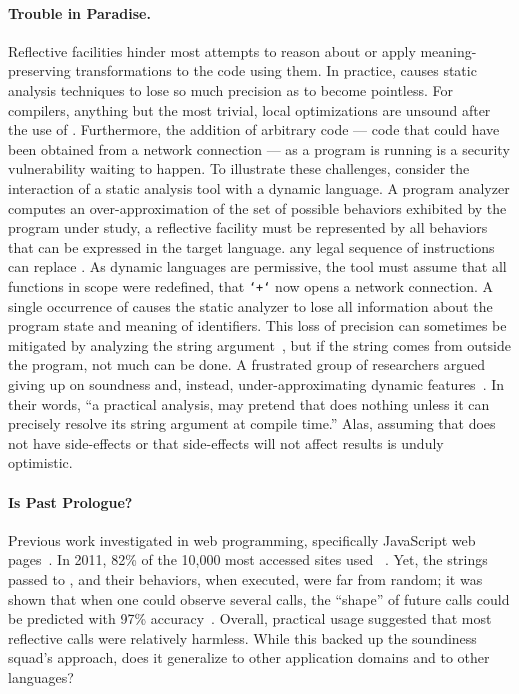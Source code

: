 \documentclass[acmsmall, screen]{acmart}
\begin{document}
\paragraph{Trouble in Paradise.} Reflective facilities hinder
most attempts to reason about or apply meaning-preserving transformations to the
code using them. In practice, \eval causes static analysis techniques to lose so
much precision as to become pointless. For compilers, anything but the most
trivial, local optimizations are unsound after the use of \eval. Furthermore,
the addition of arbitrary code --- code that could have been obtained from a
network connection --- as a program is running is a security vulnerability
waiting to happen. To illustrate these challenges, consider the interaction of a
static analysis tool with a dynamic language. A program analyzer computes an
over-approximation of the set of possible behaviors exhibited by the program
under study, a reflective facility must be represented by all behaviors that can
be expressed in the target language. \ie any legal sequence of instructions can
replace \eval. As dynamic languages are permissive, the tool must assume that
all functions in scope were redefined, \eg that \texttt{`+`} now opens a network
connection. A single occurrence of \eval causes the static analyzer to lose all
information about the program state and meaning of identifiers. This loss of
precision can sometimes be mitigated by analyzing the string
argument~\cite{moller03}, but if the string comes from outside the program, not
much can be done. A frustrated group of researchers argued giving up on
soundness and, instead, under-approximating dynamic features~\cite{soundy}. In
their words, ``a practical analysis, may pretend that \eval does nothing unless
it can precisely resolve its string argument at compile time.'' Alas, assuming
that \eval does not have side-effects or that side-effects will not affect
results is unduly optimistic.

\paragraph{Is Past Prologue?} Previous work investigated
\eval in web programming, specifically JavaScript web pages~\cite{pldi10a}. In
2011, 82\% of the 10,000 most accessed sites used \eval~\cite{ecoop11}. Yet, the
strings passed to \eval, and their behaviors, when executed, were far from
random; it was shown that when one could observe several calls, the ``shape'' of
future calls could be predicted with 97\% accuracy~\cite{oopsla12b}. Overall,
practical usage suggested that most reflective calls were relatively harmless.
While this backed up the soundiness squad's approach, does it generalize to
other application domains and to other languages?
\end{document}
